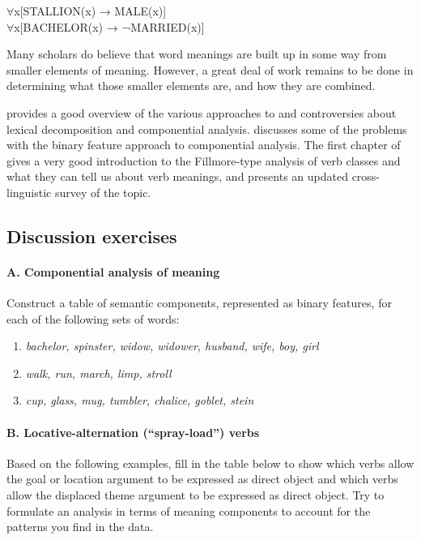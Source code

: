 \ea
${\forall}$x[STALLION(x) → MALE(x)]\\
${\forall}$x[BACHELOR(x) → ¬MARRIED(x)]
\z


Many scholars do believe that word meanings are built up in some way from smaller elements of meaning. However, a great deal of work remains to be done in determining what those smaller elements are, and how they are combined.



\furtherreading



\citet{Engelberg2011} provides a good overview of the various approaches to and controversies about lexical decomposition and componential analysis. \citet[317ff.]{Lyons1977} discusses some of the problems with the binary feature approach to componential analysis. The first chapter of \citet{Levin1993} gives a very good introduction to the Fillmore-type analysis of verb classes and what they can tell us about verb meanings, and \citet{Levin2015} presents an updated cross-linguistic survey of the topic. 


\subsection*{Discussion exercises}
\paragraph*{A.  Componential analysis of meaning}

Construct a table of semantic components, represented as binary features, for each of the following sets of words:

\begin{enumerate}
\item \itshape
bachelor, spinster, widow, widower, husband, wife, boy, girl
\item \itshape
walk, run, march, limp, stroll
\item \itshape
cup, glass, mug, tumbler, chalice, goblet, stein
\end{enumerate}

\paragraph*{B.  Locative-alternation (“spray-load”) verbs\footnotemark{}}

Based on the following examples, fill in the table below to show which verbs allow the goal or location argument to be expressed as direct object and which verbs allow the displaced theme argument to be expressed as direct object. Try to formulate an analysis in terms of meaning components to account for the patterns you find in the data.

